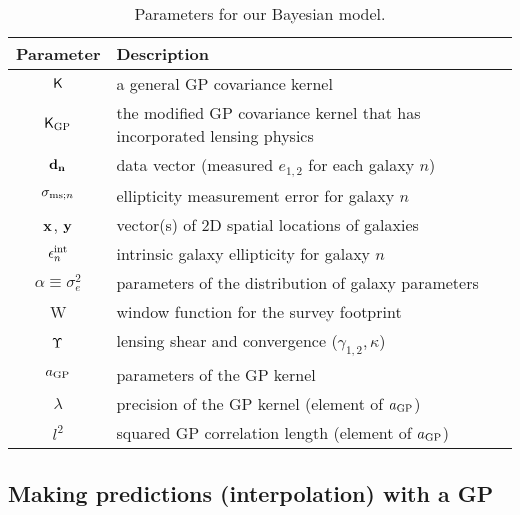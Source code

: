 \begin{table}%
\begin{center}
\caption{Parameters for our Bayesian model.}
\label{tab:sampling_parameters}
\begin{tabular}{cl}
\hline
Parameter & Description \\
\hline
$\mathsf{K}$ & a general GP covariance kernel \\
$\mathsf{K}_{\rm GP}$  & the modified GP covariance kernel that has incorporated
lensing physics\\
${\bf d_{n}}$ & data vector (measured $e_{1,2}$ for each galaxy $n$)  \\
$\sigma_{{\rm ms}; n}$ & ellipticity measurement error for galaxy $n$ 
\\
$\mathbf{x}$, $\mathbf{y}$ & vector(s) of 2D spatial locations of galaxies \\
$\epsilon_n^{\rm int}$ & intrinsic galaxy ellipticity for galaxy $n$ \\
$\alpha\equiv\sigma_{e}^2$ & parameters of the distribution of galaxy parameters \\
W & window function for the survey footprint \\
$\Upsilon$ & lensing shear and convergence ($\gamma_{1,2}, \kappa$) \\
$a_{\rm GP}$ & parameters of the GP kernel\\
$\lambda$ & precision of the GP kernel (element of $a_{\rm GP}$) \\
$l^2$ & squared GP correlation length (element of $a_{\rm GP}$) \\
\hline
\end{tabular}
\end{center}
\end{table}


\subsection{Making predictions (interpolation) with a GP}

